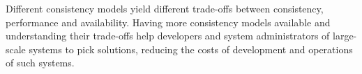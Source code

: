 \documentclass[man,floatsintext,12pt]{apa6}
\begin{document}
Different consistency models yield different trade-offs between consistency,
performance and availability. Having more consistency models available and
understanding their trade-offs help developers and system administrators of
large-scale systems to pick solutions, reducing the costs of development and
operations of such systems.

%
%
\printbibliography
\end{document}
